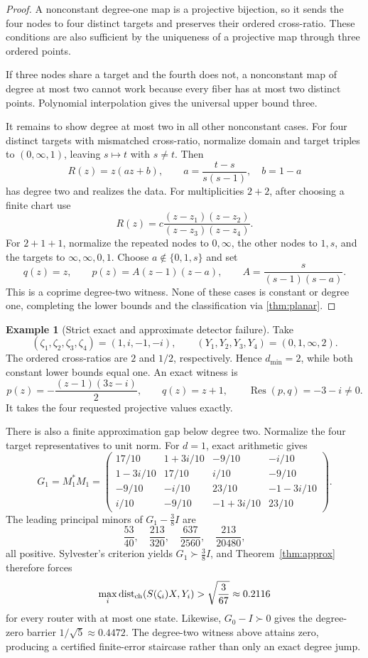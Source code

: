 \documentclass[11pt]{article}
\theoremstyle{definition}\newtheorem{definition}[theorem]{Definition}\newtheorem{example}[theorem]{Example}
\theoremstyle{remark}\newtheorem{remark}[theorem]{Remark}\newtheorem{limitation}[theorem]{Limitation}
\newcommand{\Res}{\operatorname{Res}}\newcommand{\mcdeg}{\deg_{\mathrm{McM}}}
\begin{document}
\begin{proof}
A nonconstant degree-one map is a projective bijection, so it sends the four
nodes to four distinct targets and preserves their ordered cross-ratio.  These
conditions are also sufficient by the uniqueness of a projective map through
three ordered points.

If three nodes share a target and the fourth does not, a nonconstant map of
degree at most two cannot work because every fiber has at most two distinct
points.  Polynomial interpolation gives the universal upper bound three.

It remains to show degree at most two in all other nonconstant cases.  For four
distinct targets with mismatched cross-ratio, normalize domain and target triples
to $(0,\infty,1)$, leaving $s\mapsto t$ with $s\ne t$.  Then
\[
 R(z)=z(az+b),\qquad
 a=\frac{t-s}{s(s-1)},\quad b=1-a
\]
has degree two and realizes the data.  For multiplicities $2+2$, after choosing
a finite chart use
\[
 R(z)=c\frac{(z-z_1)(z-z_2)}{(z-z_3)(z-z_4)}.
\]
For $2+1+1$, normalize the repeated nodes to $0,\infty$, the other nodes to
$1,s$, and the targets to $\infty,\infty,0,1$.  Choose
$a\notin\{0,1,s\}$ and set
\[
 q(z)=z,\qquad p(z)=A(z-1)(z-a),\qquad
 A=\frac{s}{(s-1)(s-a)}.
\]
This is a coprime degree-two witness.  None of these cases is constant or
degree one, completing the lower bounds and the classification via
\cref{thm:planar}.
\end{proof}

\begin{example}[Strict exact and approximate detector failure]\label{ex:strict}
Take
\[
 (\zeta_1,\zeta_2,\zeta_3,\zeta_4)=(1,i,-1,-i),\qquad
 (Y_1,Y_2,Y_3,Y_4)=(0,1,\infty,2).
\]
The ordered cross-ratios are $2$ and $1/2$, respectively.  Hence
$d_{\min}=2$, while both constant lower bounds equal one.  An exact witness is
\[
 p(z)=-\frac{(z-1)(3z-i)}2,\qquad q(z)=z+1,
 \qquad \Res(p,q)=-3-i\ne0.
\]
It takes the four requested projective values exactly.

There is also a finite approximation gap below degree two.  Normalize the four
target representatives to unit norm.  For $d=1$, exact arithmetic gives
\[
G_1=M_1^*M_1=
\begin{pmatrix}
17/10&1+3i/10&-9/10&-i/10\\
1-3i/10&17/10&i/10&-9/10\\
-9/10&-i/10&23/10&-1-3i/10\\
i/10&-9/10&-1+3i/10&23/10
\end{pmatrix}.
\]
The leading principal minors of $G_1-\frac38I$ are
\[
 \frac{53}{40},\quad\frac{213}{320},\quad
 \frac{637}{2560},\quad\frac{213}{20480},
\]
all positive.  Sylvester's criterion yields $G_1\succ\frac38I$, and
Theorem~\ref{thm:approx} therefore forces
\[
 \max_i\operatorname{dist}_{\rm ch}(S(\zeta_i)X,Y_i)
 >\sqrt{\frac{3}{67}}\approx0.2116
\]
for every router with at most one state.  Likewise,
$G_0-I\succ0$ gives the degree-zero barrier $1/\sqrt5\approx0.4472$.
The degree-two witness above attains zero, producing a certified finite-error
staircase rather than only an exact degree jump.
\end{example}
\end{document}

